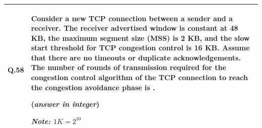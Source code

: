 \documentclass[14pt]{article}
\begin{document}
\vspace{0.3cm}

\begin{tabular}{|p{1.5cm}|p{12cm}|}
\hline

Q.58 &
{
\begin{minipage}[t]{12cm}


Consider a new TCP connection between a sender and a receiver.
The receiver advertised window is constant at 48 KB, the maximum
segment size (MSS) is 2 KB, and the slow start threshold for TCP
congestion control is 16 KB. Assume that there are no timeouts
or duplicate acknowledgements. The number of rounds of transmission
required for the congestion control algorithm of the TCP connection
to reach the congestion avoidance phase is
\underline{\hspace{2cm}}.

(\textit{answer in integer})

\vspace{0.3cm}

\textit{Note: $1K=2^{10}$}

\vspace{0.5cm}

\end{minipage}
}
\\

\hline
\end{tabular}

\vspace{0.3cm}
\end{document}
